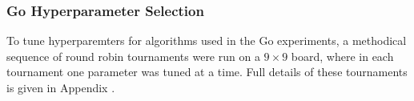 
        \subsubsection{Go Hyperparameter Selection}

            To tune hyperparemters for algorithms used in the Go experiments, a methodical sequence of round robin tournaments were run on a $9\times 9$ board, where in each tournament one parameter was tuned at a time. Full details of these tournaments is given in Appendix .
            
